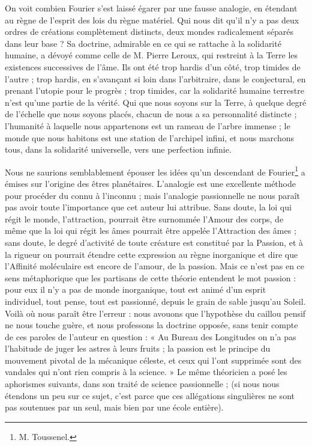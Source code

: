 \documentclass[a4paper, 11pt, oneside]{article}
\begin{document}
On voit combien Fourier s'est laissé égarer par une fausse analogie, en étendant au règne de l'esprit des lois du règne matériel. Qui nous dit qu'il n'y a pas deux ordres de créations complètement distincts, deux mondes radicalement séparés dans leur base ? Sa doctrine, admirable en ce qui se rattache à la solidarité humaine, a dévoyé comme celle de M. Pierre Leroux, qui restreint à la Terre les existences successives de l'âme. Ils ont été trop hardis d'un côté, trop timides de l'autre ; trop hardis, en s'avançant si loin dans l'arbitraire, dans le conjectural, en prenant l'utopie pour le progrès ; trop timides, car la solidarité humaine terrestre n'est qu'une partie de la vérité. Qui que nous soyons sur la Terre, à quelque degré de l'échelle que nous soyons placés, chacun de nous a sa personnalité distincte ; l'humanité à laquelle nous appartenons est un rameau de l'arbre immense ; le monde que nous habitons est une station de l'archipel infini, et nous marchons tous, dans la solidarité universelle, vers une perfection infinie.

Nous ne saurions semblablement épouser les idées qu'un descendant de Fourier\footnote{M. Toussenel.} a émises sur l'origine des êtres planétaires. L'analogie est une excellente méthode pour procéder du connu à l'inconnu ; mais l'analogie passionnelle ne nous paraît pas avoir toute l'importance que cet auteur lui attribue. Sans doute, la loi qui régit le monde, l'attraction, pourrait être surnommée l'Amour des corps, de même que la loi qui régit les âmes pourrait être appelée l'Attraction des âmes ; sans doute, le degré d'activité de toute créature est constitué par la Passion, et à la rigueur on pourrait étendre cette expression au règne inorganique et dire que l'Affinité moléculaire est encore de l'amour, de la passion. Mais ce n'est pas en ce sens métaphorique que les partisans de cette théorie entendent le mot passion : pour eux il n'y a pas de monde inorganique, tout est animé d'un esprit individuel, tout pense, tout est passionné, depuis le grain de sable jusqu'au Soleil. Voilà où nous paraît être l'erreur : nous avouons que l'hypothèse du caillou pensif ne nous touche guère, et nous professons la doctrine opposée, sans tenir compte de ces paroles de l'auteur en question : « Au Bureau des Longitudes on n'a pas l'habitude de juger les astres à leurs fruits ; la passion est le principe du mouvement pivotal de la mécanique céleste, et ceux qui l'ont supprimée sont des vandales qui n'ont rien compris à la science. » Le même théoricien a posé les aphorismes suivants, dans son traité de science passionnelle ; (si nous nous étendons un peu sur ce sujet, c'est parce que ces allégations singulières ne sont pas soutenues par un seul, mais bien par une école entière).
\end{document}
